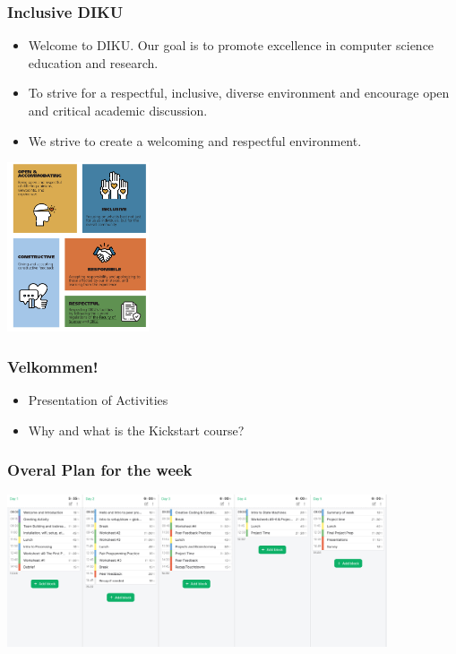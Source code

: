\documentclass[10pt]{beamer}
\begin{document}

\begin{frame}
\frametitle{Inclusive DIKU}
\begin{minipage}{0.5\linewidth}
\begin{itemize}
\item Welcome to DIKU. Our goal is to promote excellence in computer science education and research. 
\item To strive for a respectful, inclusive, diverse environment and encourage open and critical academic discussion. 
\item We strive to create a welcoming and respectful environment.
\end{itemize}
\end{minipage}
\begin{minipage}{0.4\linewidth}
\includegraphics[height=5cm]{images/diku_cc}
\end{minipage}
\end{frame}


 \begin{frame}
   \frametitle{Velkommen!}

   \begin{itemize}
   \item Presentation of Activities
   \item Why and what is the Kickstart course?
   \end{itemize}
 \end{frame}
 

\begin{frame}
\frametitle{Overal Plan for the week}
\includegraphics[height=4.5cm]{images/visual_schedule23}
\end{frame}
\end{document}
